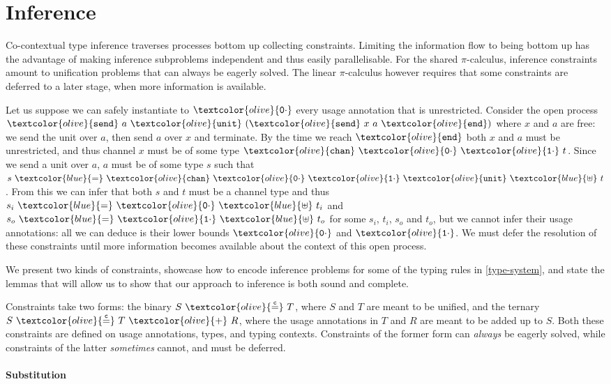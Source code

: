 \documentclass[sigplan,screen,review]{acmart}
\newcommand{\picalc}{$\pi$-calculus}
\newcommand{\constr}[1]{\textcolor{olive}{\mathtt{#1}}}
\newcommand{\type}[1]{\textcolor{blue}{\mathtt{#1}}}
\newcommand{\tSplit}[3]{#1~\type{=}~#2~\type{\uplus}~#3}
\newcommand{\sunit}{\constr{unit}}
\newcommand{\send}{\constr{end}}
\newcommand{\ssend}{\constr{send}}
\newcommand{\tchan}{\constr{chan}}
\newcommand{\tunit}{\constr{unit}}
\newcommand{\tzero}{\constr{0\cdot}}
\newcommand{\tone}{\constr{1\cdot}}
\newcommand{\eqconstr}[2]{#1 ~ \constr{\stackrel{c}{=}} ~ #2}
\newcommand{\sumconstr}[3]{#1 ~ \constr{\stackrel{c}{=}} ~ #2 ~ \constr{+} ~ #3}
\begin{document}
     
\section{Inference}\label{inference}

Co-contextual type inference traverses processes bottom up collecting constraints.
Limiting the information flow to being bottom up has the advantage of making inference subproblems independent and thus easily parallelisable.
For the shared \picalc{}, inference constraints amount to unification problems that can always be eagerly solved.
The linear \picalc{} however requires that some constraints are deferred to a later stage, when more information is available.

Let us suppose we can safely instantiate to $\tzero$ every usage annotation that is unrestricted.
Consider the open process $\ssend~a~\sunit~(\ssend~x~a~\send)$ where $x$ and $a$ are free: we send the unit over $a$, then send $a$ over $x$ and terminate.
By the time we reach $\send$ both $x$ and $a$ must be unrestricted, and thus channel $x$ must be of some type $\tchan~\tzero~\tone~t$.
Since we send a unit over $a$, $a$ must be of some type $s$ such that $\tSplit{s}{\tchan~\tzero~\tone~\tunit}{t}$.
From this we can infer that both $s$ and $t$ must be a channel type and thus $\tSplit{s_i}{\tzero}{t_i}$ and $\tSplit{s_o}{\tone}{t_o}$ for some $s_i$, $t_i$, $s_o$ and $t_o$, but we cannot infer their usage annotations: all we can deduce is their lower bounds $\tzero$ and $\tone$.
We must defer the resolution of these constraints until more information becomes available about the context of this open process.

We present two kinds of constraints, showcase how to encode inference problems for some of the typing rules in \autoref{type-system}, and state the lemmas that will allow us to show that our approach to inference is both sound and complete.

Constraints take two forms: the binary $\eqconstr{S}{T}$, where $S$ and $T$ are meant to be unified, and the ternary $\sumconstr{S}{T}{R}$, where the usage annotations in $T$ and $R$ are meant to be added up to $S$.
Both these constraints are defined on usage annotations, types, and typing contexts.
Constraints of the former form can \emph{always} be eagerly solved, while constraints of the latter \emph{sometimes} cannot, and must be deferred.

\paragraph{Substitution}
\end{document}

